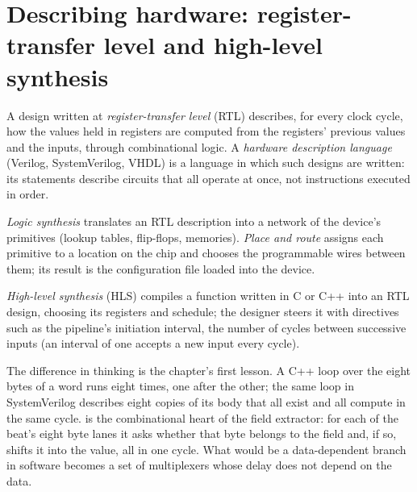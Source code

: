 \section{Describing hardware: register-transfer level and high-level synthesis}

\begin{definition}\label{def:nw:programmable-hardware-i-architecture-and-toolchain:rtl}
A design written at \emph{register-transfer level} (RTL) describes, for every clock cycle, how the values
held in registers are computed from the registers' previous values and the inputs, through combinational logic. A \emph{hardware
description language} (Verilog, SystemVerilog, VHDL) is a language in which such designs are
written: its statements describe circuits that all operate at once, not instructions executed in order.
\end{definition}

\begin{definition}\label{def:nw:programmable-hardware-i-architecture-and-toolchain:synth}
\emph{Logic synthesis} translates an RTL description into a network of the device's primitives (lookup tables,
flip-flops, memories). \emph{Place and route} assigns each primitive to a location on the chip and chooses the
programmable wires between them; its result is the configuration file loaded into the device.
\end{definition}

\begin{definition}\label{def:nw:programmable-hardware-i-architecture-and-toolchain:hls}
\emph{High-level synthesis} (HLS) compiles a function written in C or C++ into an RTL design, choosing its
registers and schedule; the designer steers it with directives such as the pipeline's initiation interval, the number of cycles between
successive inputs (an interval of one accepts a new input every cycle).
\end{definition}

The difference in thinking is the chapter's first lesson. A C++ loop over the eight bytes of a word runs eight times, one after the
other; the same loop in SystemVerilog describes eight copies of its body that all exist and all compute in the same cycle.
 is the combinational heart of the field extractor: for each of the
beat's eight byte lanes it asks whether that byte belongs to the field and, if so, shifts it into the value, all in one cycle. What would
be a data-dependent branch in software becomes a set of multiplexers whose delay does not depend on the data.

